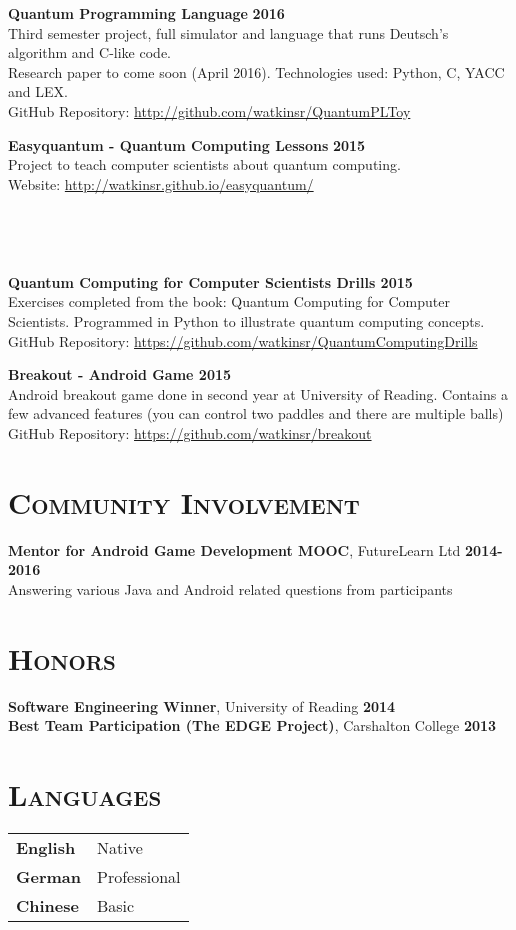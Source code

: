 \documentclass[line, margin, 10pt]{res}
\begin{document}
\begin{resume}
{\bf Quantum Programming Language} {\bf \hfill 2016}\\
Third semester project, full simulator and language that runs Deutsch's algorithm and C-like code.\\ Research paper to come soon (April 2016). Technologies used: Python, C, YACC and LEX.\\ 
GitHub Repository: \url{http://github.com/watkinsr/QuantumPLToy}

{\bf Easyquantum - Quantum Computing Lessons} {\bf \hfill 2015}\\
Project to teach computer scientists about quantum computing. \\
Website: \url{http://watkinsr.github.io/easyquantum/}
\\\\\\\\\\
{\bf Quantum Computing for Computer Scientists Drills {\bf \hfill 2015}} \\
Exercises completed from the book: Quantum Computing for Computer Scientists. Programmed in Python to illustrate quantum computing concepts.\\
GitHub Repository: \url{https://github.com/watkinsr/QuantumComputingDrills}

{\bf Breakout - Android Game {\bf \hfill 2015}} \\
Android breakout game done in second year at University of Reading. Contains a few advanced features (you can control two paddles and there are multiple balls)\\
GitHub Repository: \url{https://github.com/watkinsr/breakout}

\section{\textsc{Community Involvement}}

{\bf Mentor for Android Game Development MOOC}, FutureLearn Ltd {\bf \hfill 2014-2016}\\
Answering various Java and Android related questions from participants

\section{\textsc{Honors}}

{\bf Software Engineering Winner}, University of Reading {\bf \hfill 2014}\\
{\bf Best Team Participation (The EDGE Project)}, Carshalton College {\bf \hfill 2013}

\section{\textsc{Languages}}
\begin{tabular}[t]{@{} p{1.2in} p{3.75in} @{}}

\textbf{English} & Native\\ 
\textbf{German} & Professional\\ \textbf{Chinese} & Basic

\end{tabular}

\end{resume}
\end{document}
